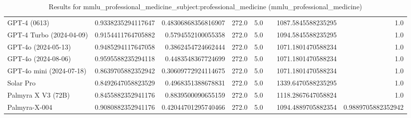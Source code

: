\begin{table}[htp]
{\begin{tabular}{lrrrrrrr}
GPT-4 (0613) & 0.9338235294117647 & 0.48306868356816907 & 272.0 & 5.0 &  & 1087.5845588235295 & 1.0 \\
GPT-4 Turbo (2024-04-09) & 0.9154411764705882 & 0.5794552100055358 & 272.0 & 5.0 &  & 1094.5845588235295 & 1.0 \\
GPT-4o (2024-05-13) & 0.9485294117647058 & 0.3862454724662444 & 272.0 & 5.0 &  & 1071.1801470588234 & 1.0 \\
GPT-4o (2024-08-06) & 0.9595588235294118 & 0.4483548367724699 & 272.0 & 5.0 &  & 1071.1801470588234 & 1.0 \\
GPT-4o mini (2024-07-18) & 0.8639705882352942 & 0.30609772924114675 & 272.0 & 5.0 &  & 1071.1801470588234 & 1.0 \\
Solar Pro & 0.8492647058823529 & 0.4968351388678831 & 272.0 & 5.0 &  & 1339.6470588235295 & 1.0 \\
Palmyra X V3 (72B) & 0.8455882352941176 & 0.8839500090655159 & 272.0 & 5.0 &  & 1118.2867647058824 & 1.0 \\
Palmyra-X-004 & 0.9080882352941176 & 0.42044701295740466 & 272.0 & 5.0 &  & 1094.4889705882354 & 0.9889705882352942 \\
\bottomrule
\end{tabular}}
\caption{Results for mmlu_professional_medicine_subject:professional_medicine (mmlu_professional_medicine)}
\label{fig:mmlu_professional_medicine_subject:professional_medicine (mmlu_professional_medicine)}
\end{table}